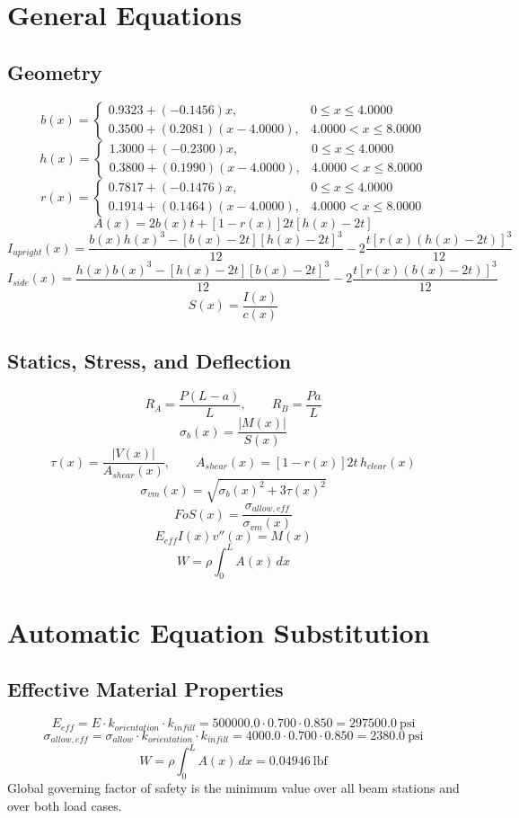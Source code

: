 \documentclass[11pt]{article}
\begin{document}
\section*{General Equations}
\subsection*{Geometry}
\[
b(x)=\begin{cases}0.9323 + (-0.1456)x, & 0 \le x \le 4.0000\\0.3500 + (0.2081)(x-4.0000), & 4.0000 < x \le 8.0000\end{cases}
\]
\[
h(x)=\begin{cases}1.3000 + (-0.2300)x, & 0 \le x \le 4.0000\\0.3800 + (0.1990)(x-4.0000), & 4.0000 < x \le 8.0000\end{cases}
\]
\[
r(x)=\begin{cases}0.7817 + (-0.1476)x, & 0 \le x \le 4.0000\\0.1914 + (0.1464)(x-4.0000), & 4.0000 < x \le 8.0000\end{cases}
\]
\[
A(x)=2b(x)t+[1-r(x)]2t[h(x)-2t]
\]
\[
I_{upright}(x)=\frac{b(x)h(x)^3-[b(x)-2t][h(x)-2t]^3}{12}-2\frac{t[r(x)(h(x)-2t)]^3}{12}
\]
\[
I_{side}(x)=\frac{h(x)b(x)^3-[h(x)-2t][b(x)-2t]^3}{12}-2\frac{t[r(x)(b(x)-2t)]^3}{12}
\]
\[
S(x)=\frac{I(x)}{c(x)}
\]

\subsection*{Statics, Stress, and Deflection}
\[
R_A=\frac{P(L-a)}{L}, \qquad R_B=\frac{Pa}{L}
\]
\[
\sigma_b(x)=\frac{|M(x)|}{S(x)}
\]
\[
\tau(x)=\frac{|V(x)|}{A_{shear}(x)}, \qquad A_{shear}(x)=[1-r(x)]2t\,h_{clear}(x)
\]
\[
\sigma_{vm}(x)=\sqrt{\sigma_b(x)^2+3\tau(x)^2}
\]
\[
FoS(x)=\frac{\sigma_{allow,eff}}{\sigma_{vm}(x)}
\]
\[
E_{eff}I(x)v''(x)=M(x)
\]
\[
W=\rho\int_0^L A(x)\,dx
\]

\section*{Automatic Equation Substitution}
\subsection*{Effective Material Properties}
\[E_{eff} = E \cdot k_{orientation} \cdot k_{infill} = 500000.0 \cdot 0.700 \cdot 0.850 = 297500.0\ \mathrm{psi}\]
\[\sigma_{allow,eff} = \sigma_{allow} \cdot k_{orientation} \cdot k_{infill} = 4000.0 \cdot 0.700 \cdot 0.850 = 2380.0\ \mathrm{psi}\]
\[W = \rho \int_0^L A(x)\,dx = 0.04946\ \mathrm{lbf}\]
Global governing factor of safety is the minimum value over all beam stations and over both load cases.
\end{document}
